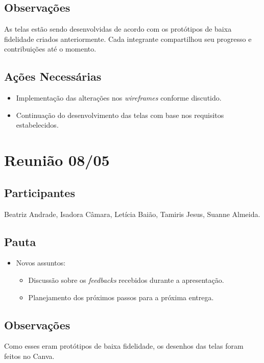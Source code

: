 \begin{apendicesenv}
\subsection*{Observações}
As telas estão sendo desenvolvidas de acordo com os protótipos de baixa fidelidade criados anteriormente.
Cada integrante compartilhou seu progresso e contribuições até o momento.

\subsection*{Ações Necessárias}
\begin{itemize}
    \item Implementação das alterações nos \textit{wireframes} conforme discutido.
    \item Continuação do desenvolvimento das telas com base nos requisitos estabelecidos.
\end{itemize}

\section*{Reunião 08/05}

\subsection*{Participantes}
Beatriz Andrade, Isadora Câmara, Letícia Baião, Tamiris Jesus, Suanne Almeida.

\subsection*{Pauta}
\begin{itemize}
    \item Novos assuntos:
    \begin{itemize}
        \item Discussão sobre os \textit{feedbacks} recebidos durante a apresentação.
        \item Planejamento dos próximos passos para a próxima entrega.
    \end{itemize}
\end{itemize}

\subsection*{Observações}
Como esses eram protótipos de baixa fidelidade, os desenhos das telas foram feitos no Canva.


\end{apendicesenv}
